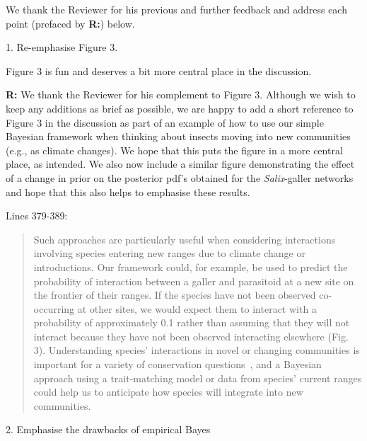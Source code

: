 \documentclass[12pt]{letter}
\newenvironment{refquote}{\bigskip \begin{it}}{\end{it}\smallskip}
\begin{document}
	We thank the Reviewer for his previous and further feedback and address each point (prefaced by \textbf{R:}) below.

	1. Re-emphasise Figure 3. 

		\begin{refquote}

			Figure 3 is fun and deserves a bit more central place in the discussion. 

		\end{refquote}


		\textbf{R:} We thank the Reviewer for his complement to Figure 3. Although we wish to keep any additions as brief as possible, we are happy to add a short reference to Figure 3 in the discussion as part of an example of how to use our simple Bayesian framework when thinking about insects moving into new communities (e.g., as climate changes). We hope that this puts the figure in a more central place, as intended. We also now include a similar figure demonstrating the effect of a change in prior on the posterior pdf's obtained for the \emph{Salix}-galler networks and hope that this also helps to emphasise these results.


		Lines 379-389:

		\begin{quotation}

			Such approaches are particularly useful when considering interactions involving species entering new ranges due to climate change or introductions. Our framework could, for example, be used to predict the probability of interaction between a galler and parasitoid at a new site on the frontier of their ranges. If the species have not been observed co-occurring at other sites, we would expect them to interact with a probability of approximately 0.1 rather than assuming that they will not interact because they have not been observed interacting elsewhere (Fig. 3). Understanding species' interactions in novel or changing communities is important for a variety of conservation questions~\citep{Bartomeus2013,Gravel2013}, and a Bayesian approach using a trait-matching model or data from species' current ranges could help us to anticipate how species will integrate into new communities. 

		\end{quotation}


	2. Emphasise the drawbacks of empirical Bayes
\end{document}
